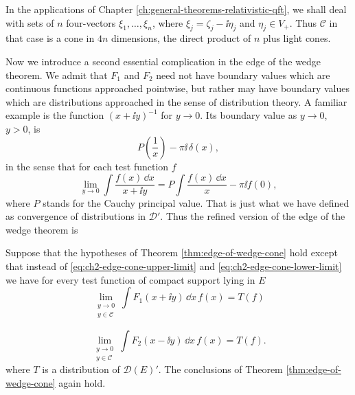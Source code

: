 In the applications of Chapter \ref{ch:general-theorems-relativistic-qft}, we shall deal with sets of $n$ four-vectors
$\xi_1,\ldots,\xi_n$, where $\xi_j=\zeta_j-\ii\eta_j$ and
$\eta_j\in V_+$. Thus $\mathcal{C}$ in that case is a cone in $4n$
dimensions, the direct product of $n$ plus light cones.

Now we introduce a second essential complication in the edge of the wedge
theorem. We admit that $F_1$ and $F_2$ need not have boundary values which are
continuous functions approached pointwise, but rather may have boundary values
which are distributions approached in the sense of distribution theory. A
familiar example is the function $(x+\ii y)^{-1}$ for $y\to0$. Its
boundary value as $y\to0$, $y>0$, is
\[
  P\!\left(\frac{1}{x}\right)-\pi\ii\,\delta(x),
\]
in the sense that for each test function $f$
\[
  \lim_{y\to0}\int\frac{f(x)\,\dd x}{x+\ii y}
  =P\int\frac{f(x)\,\dd x}{x}-\pi\ii f(0),
\]
where $P$ stands for the Cauchy principal value. That is just what we have
defined as convergence of distributions in $\mathcal{D}'$. Thus the refined
version of the edge of the wedge theorem is

\begin{theorem}\label{thm:edge-of-wedge-distributional}
Suppose that the hypotheses of Theorem \ref{thm:edge-of-wedge-cone} hold except that instead of
\eqref{eq:ch2-edge-cone-upper-limit} and \eqref{eq:ch2-edge-cone-lower-limit} we have for every test function of compact support lying
in $E$
\[
  \lim_{\substack{y\to0\\y\in\mathcal{C}}}
  \int F_1(x+\ii y)\,\dd x\,f(x)=T(f)
\]

\[
  \lim_{\substack{y\to0\\y\in\mathcal{C}}}
  \int F_2(x-\ii y)\,\dd x\,f(x)=T(f).
\]
where $T$ is a distribution of $\mathcal{D}(E)'$. The conclusions of
Theorem \ref{thm:edge-of-wedge-cone} again hold.
\end{theorem}

